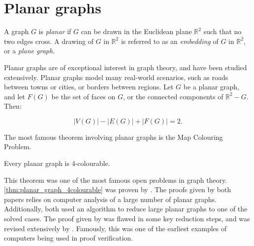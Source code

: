 \section{Planar graphs}
A graph \(G\) is \textit{planar} if \(G\) can be drawn in the Euclidean plane \( \mathbb{R}^2 \) such that no two edges cross. A drawing of $G$ in $\mathbb{R}^2$ is referred to as an \textit{embedding} of $G$ in $\mathbb{R}^2$, or a \textit{plane graph}. 

Planar graphs are of exceptional interest in graph theory, and have been studied extensively. Planar graphs model many real-world scenarios, such as roads between towns or cities, or borders between regions.
Let $G$ be a planar graph, and let $F(G)$ be the set of faces on $G$, or the connected components of $\mathbb{R}^2 - G$. Then:
\begin{theorem}
	\begin{equation}
		|V(G)| - |E(G)| + |F(G)| = 2. 
	\end{equation}
\end{theorem}

The most famous theorem involving planar graphs is the Map Colouring Problem.
\begin{theorem}\label{thm:planar_graph_4colourable}
	Every planar graph is 4-colourable. 
\end{theorem}
This theorem was one of the most famous open problems in graph theory.
\cref{thm:planar_graph_4colourable} was proven by \textcite{appelEveryPlanarMap1989,robertsonEfficientlyFourcoloringPlanar1996}. The proofs given by both papers relies on computer analysis of a large number of planar graphs. Additionally, both used an algorithm to reduce large planar graphs to one of the solved cases. The proof given by \textcite{appelEveryPlanarMap1989} was flawed in some key reduction steps, and was revised extensively by \textcite{robertsonEfficientlyFourcoloringPlanar1996}. Famously, this was one of the earliest examples of computers being used in proof verification.
